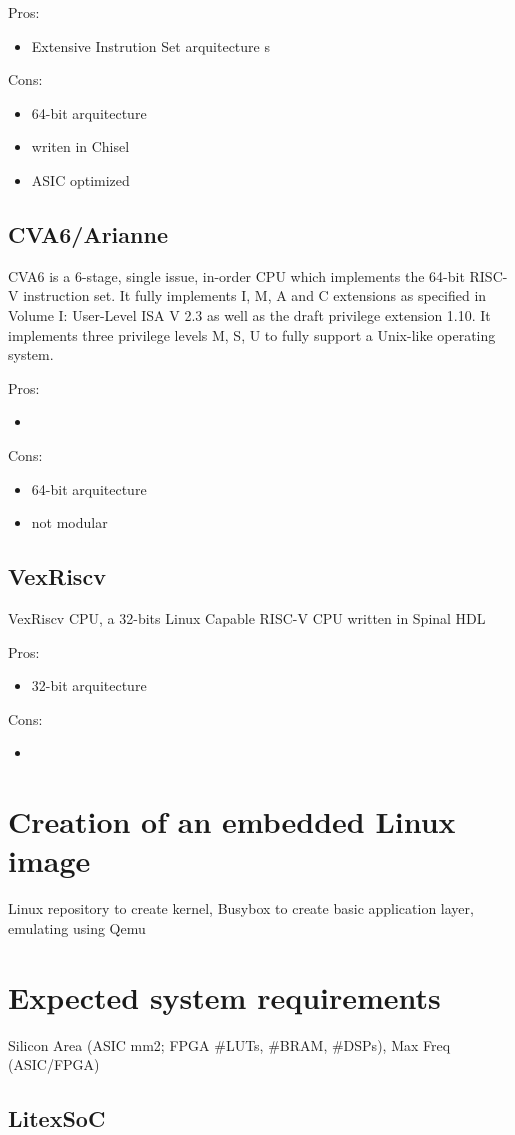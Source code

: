 \quad Pros:
\begin{itemize}
  \item Extensive Instrution Set arquitecture s
\end{itemize}
\quad Cons:
\begin{itemize}
  \item 64-bit arquitecture
  \item writen in Chisel
  \item ASIC optimized
\end{itemize}

\subsection{CVA6/Arianne}
\quad CVA6 is a 6-stage, single issue, in-order CPU which implements the 64-bit RISC-V instruction set. It fully implements I, M, A and C extensions as specified in Volume I: User-Level ISA V 2.3 as well as the draft privilege extension 1.10. It implements three privilege levels M, S, U to fully support a Unix-like operating system.

\quad Pros:
\begin{itemize}
  \item
\end{itemize}
\quad Cons:
\begin{itemize}
  \item 64-bit arquitecture
  \item not modular
\end{itemize}

\subsection{VexRiscv}
\quad VexRiscv CPU, a 32-bits Linux Capable RISC-V CPU written in Spinal HDL

\quad Pros:
\begin{itemize}
  \item 32-bit arquitecture
\end{itemize}
\quad Cons:
\begin{itemize}
  \item
\end{itemize}


\section{Creation of an embedded Linux image}
\quad Linux repository to create kernel, Busybox to create basic application layer, emulating using Qemu

\section{Expected system requirements}
\quad Silicon Area (ASIC mm2; FPGA #LUTs, #BRAM, #DSPs), Max Freq (ASIC/FPGA)
\subsection{LitexSoC}
